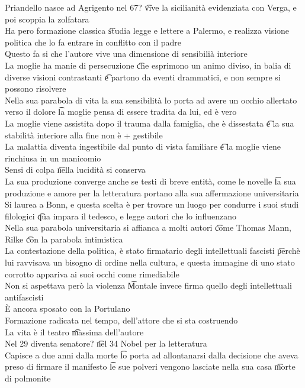 \documentclass[12pt]{article}
\begin{document}
Priandello nasce ad Agrigento nel 67? \t vive la sicilianità evidenziata con Verga, e poi scoppia la zolfatara \\
Ha pero formazione classica \t studia legge e lettere a Palermo, e realizza visione politica che lo fa entrare in conflitto con il padre \\
Questo fa si che l'autore vive una dimensione di sensibilià interiore \\
La moglie ha manie di persecuzione \t che esprimono un animo diviso, in balia di diverse visioni contrastanti \t e partono da eventi drammatici, e non sempre si possono risolvere \\
Nella sua parabola di vita la sua sensibilità lo porta ad avere un occhio allertato verso il dolore \t la moglie pensa di essere tradita da lui, ed è vero \\
La moglie viene assistita dopo il trauma dalla famiglia, che è dissestata \t e la sua stabilità interiore alla fine non è + gestibile \\
La malattia diventa ingestibile dal punto di vista familiare \t e la moglie viene rinchiusa in un manicomio \\
Sensi di colpa \t nella lucidità si conserva \\
La sua produzione converge anche se testi di breve entità, come le novelle \t la sua produzione e amore per la letteratura portano alla sua affermazione universitaria \\
Si laurea a Bonn, e questa scelta è per trovare un luogo per condurre i suoi studi filologici \t qua impara il tedesco, e legge autori che lo influenzano \\
Nella sua parabola universitaria si affianca a molti autori \t come Thomas Mann, Rilke \t con la parabola intimistica \\
La contestazione della politica, è stato firmatario degli intellettuali fascisti \t perchè lui ravvisava un bisogno di ordine nella cultura, e questa immagine di uno stato corrotto appariva ai suoi occhi come rimediabile \\
Non si aspettava però la violenza \t Montale invece firma quello degli intellettuali antifascisti \\
È ancora sposato con la Portulano \\
Formazione radicata nel tempo, dell'attore che si sta costruendo \\
La vita è il teatro \t massima dell'autore \\
Nel 29 diventa senatore? \t nel 34 Nobel per la letteratura \\
Capisce a due anni dalla morte \t lo porta ad allontanarsi dalla decisione che aveva preso di firmare il manifesto \t le sue polveri vengono lasciate nella sua casa \t morte di polmonite
\end{document}

